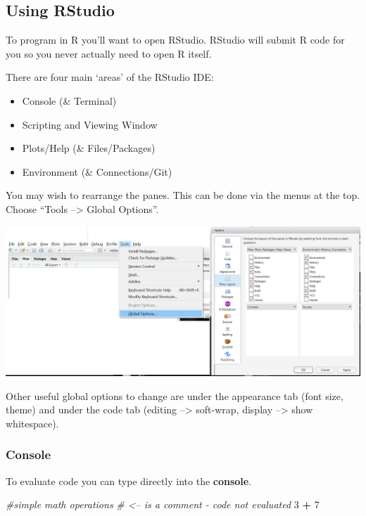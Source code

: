 \documentclass[
]{book}
\newenvironment{Shaded}{\begin{snugshade}}{\end{snugshade}}
\newcommand{\CommentTok}[1]{\textcolor[rgb]{0.56,0.35,0.01}{\textit{#1}}}
\newcommand{\DecValTok}[1]{\textcolor[rgb]{0.00,0.00,0.81}{#1}}
\newcommand{\OperatorTok}[1]{\textcolor[rgb]{0.81,0.36,0.00}{\textbf{#1}}}
\newcommand{\StringTok}[1]{\textcolor[rgb]{0.31,0.60,0.02}{#1}}
\theoremstyle{definition}
\theoremstyle{definition}
\theoremstyle{definition}
\theoremstyle{remark}
\begin{document}
\hypertarget{using-rstudio}{%
\subsection{Using RStudio}\label{using-rstudio}}

To program in R you'll want to open RStudio. RStudio will submit R code for you so you never actually need to open R itself.

There are four main `areas' of the RStudio IDE:

\begin{itemize}
\item
  Console (\& Terminal)
\item
  Scripting and Viewing Window
\item
  Plots/Help (\& Files/Packages)
\item
  Environment (\& Connections/Git)
\end{itemize}

You may wish to rearrange the panes. This can be done via the menus at the top. Choose ``Tools --\textgreater{} Global Options''.

\begin{center}\includegraphics[width=0.8\linewidth]{img/panes} \end{center}

Other useful global options to change are under the appearance tab (font size, theme) and under the code tab (editing --\textgreater{} soft-wrap, display --\textgreater{} show whitespace).

\hypertarget{console}{%
\subsubsection{Console}\label{console}}

To evaluate code you can type directly into the \textbf{console}.

\begin{Shaded}
\begin{Highlighting}[]
\CommentTok{#simple math operations}
\CommentTok{# <-- is a comment - code not evaluated}
\DecValTok{3} \OperatorTok{+}\StringTok{ }\DecValTok{7}
\end{Highlighting}
\end{Shaded}
\end{document}

